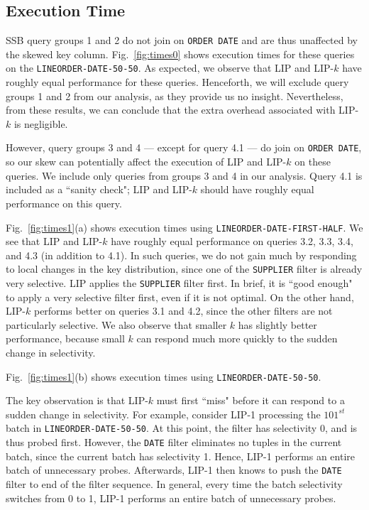 \subsection{Execution Time}
\label{sec:time}


SSB query groups 1 and 2 do not join on \texttt{ORDER DATE} and are thus unaffected by the skewed key column. 
Fig.~\ref{fig:times0} shows execution times for these queries on the \texttt{LINEORDER-DATE-50-50}.
As expected, we observe that LIP and LIP-$k$ have roughly equal performance for these queries.
Henceforth, we will exclude query groups 1 and 2 from our analysis, 
as they provide us no insight. 
Nevertheless, from these results, we can conclude that the extra overhead associated with LIP-$k$ is negligible.



However, query groups 3 and 4 --- except for query 4.1 --- do join on \texttt{ORDER DATE}, so our skew can potentially affect the execution of LIP and LIP-$k$ on these queries.
We include only queries from groups 3 and 4 in our analysis. 
Query 4.1 is included as a ``sanity check"; LIP and LIP-$k$ should have roughly equal performance on this query.

Fig.~\ref{fig:times1}(a) shows execution times using \texttt{LINEORDER-DATE-FIRST-HALF}. 
We see that LIP and LIP-$k$ have roughly equal performance on queries 3.2, 3.3, 3.4, and 4.3 (in addition to 4.1).
In such queries, we do not gain much by responding to local changes in the key distribution,
since one of the \texttt{SUPPLIER} filter is already very selective. 
LIP applies the \texttt{SUPPLIER} filter first.
In brief, it is ``good enough" to apply a very selective filter first, even if it is not optimal.
On the other hand, LIP-$k$ performs better on queries 3.1 and 4.2, 
since the other filters are not particularly selective. 
We also observe that smaller $k$ has slightly better performance, 
because small $k$ can respond much more quickly to the sudden change in selectivity.

Fig.~\ref{fig:times1}(b) shows execution times using \texttt{LINEORDER-DATE-50-50}. 

The key observation is that LIP-$k$ must first ``miss" before it can respond to a sudden change in selectivity.
For example, consider LIP-1 processing the $101^{st}$ batch in \texttt{LINEORDER-DATE-50-50}. 
At this point, the  filter has selectivity 0, and is thus probed first. 
However, the \texttt{DATE} filter eliminates no tuples in the current batch, since the current batch has selectivity 1.
Hence, LIP-1 performs an entire batch of unnecessary probes. 
Afterwards, LIP-1 then knows to push the \texttt{DATE} filter to end of the filter sequence. 
In general, every time the batch selectivity switches from 0 to 1, 
LIP-1 performs an entire batch of unnecessary probes. 

